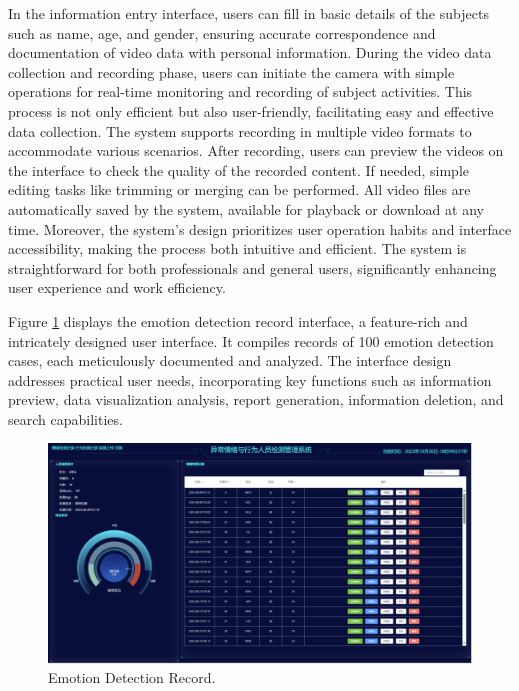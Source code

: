 \documentclass[preprint,12pt]{elsarticle}
\begin{document}
In the information entry interface, users can fill in basic details of the subjects such as name, age, and gender, ensuring accurate correspondence and documentation of video data with personal information. During the video data collection and recording phase, users can initiate the camera with simple operations for real-time monitoring and recording of subject activities. This process is not only efficient but also user-friendly, facilitating easy and effective data collection. The system supports recording in multiple video formats to accommodate various scenarios. After recording, users can preview the videos on the interface to check the quality of the recorded content. If needed, simple editing tasks like trimming or merging can be performed. All video files are automatically saved by the system, available for playback or download at any time. Moreover, the system's design prioritizes user operation habits and interface accessibility, making the process both intuitive and efficient. The system is straightforward for both professionals and general users, significantly enhancing user experience and work efficiency.

Figure \ref{fig3} displays the emotion detection record interface, a feature-rich and intricately designed user interface. It compiles records of 100 emotion detection cases, each meticulously documented and analyzed. The interface design addresses practical user needs, incorporating key functions such as information preview, data visualization analysis, report generation, information deletion, and search capabilities.
\begin{figure}[h]%
\centering
\includegraphics[width=1\textwidth]{Fig3.png}
\caption{Emotion Detection Record.}\label{fig3}
\end{figure}
\end{document}
